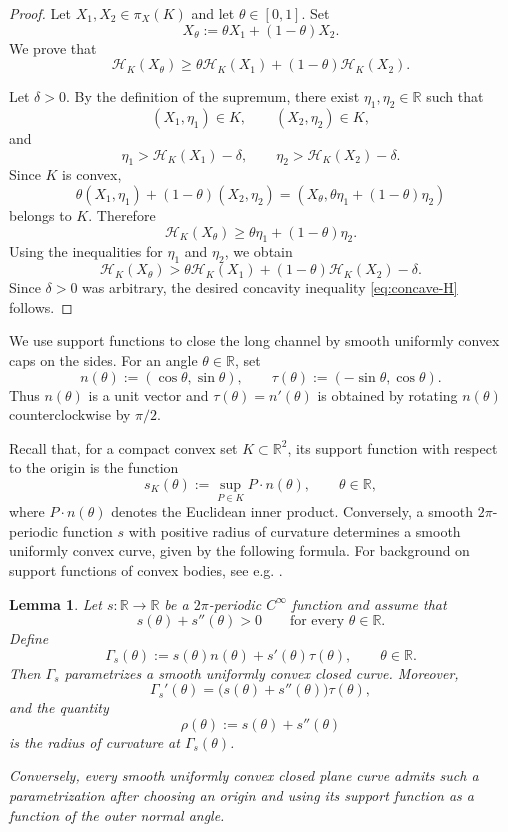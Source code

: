 \documentclass[reqno,12pt]{amsart}
\numberwithin{equation}{section}
\newtheorem{lemma}[theorem]{Lemma}
\theoremstyle{remark}
\begin{document}
\begin{proof}
Let $X_1,X_2\in\pi_X(K)$ and let $\theta\in[0,1]$.  Set
$$
X_\theta:=\theta X_1+(1-\theta)X_2.
$$
We prove that
\begin{equation}\label{eq:concave-H}
    \mathcal H_K(X_\theta)\ge \theta \mathcal H_K(X_1)+(1-\theta)\mathcal H_K(X_2).
\end{equation}

Let $\delta>0$.  By the definition of the supremum, there exist
$\eta_1,\eta_2\in\mathbb R$ such that
$$
(X_1,\eta_1)\in K,\qquad (X_2,\eta_2)\in K,
$$
and
$$
\eta_1>\mathcal H_K(X_1)-\delta,\qquad \eta_2>\mathcal H_K(X_2)-\delta.
$$
Since $K$ is convex,
$$
\theta(X_1,\eta_1)+(1-\theta)(X_2,\eta_2) = (X_\theta,\theta\eta_1+(1-\theta)\eta_2)
$$
belongs to $K$.  Therefore
$$
\mathcal H_K(X_\theta)\ge \theta\eta_1+(1-\theta)\eta_2.
$$
Using the inequalities for $\eta_1$ and $\eta_2$, we obtain
$$
\mathcal H_K(X_\theta)
> \theta \mathcal H_K(X_1)+(1-\theta)\mathcal H_K(X_2)-\delta.
$$
Since $\delta>0$ was arbitrary, the desired concavity inequality \eqref{eq:concave-H} follows.
\end{proof}
 
 



We  use support functions  to close the long channel by smooth uniformly convex caps on the sides.   For an angle $\theta\in\mathbb R$, set
$$
 n(\theta):=(\cos\theta,\sin\theta),
 \qquad
 \tau(\theta):=(-\sin\theta,\cos\theta).
$$
Thus $n(\theta)$ is a unit vector and $\tau(\theta)=n'(\theta)$ is obtained by
rotating $n(\theta)$ counterclockwise by $\pi/2$.

Recall that, for a  compact convex set $K\subset\mathbb R^2$, its support function with respect to the origin is the function
$$
 s_K(\theta):=\sup_{P\in K} P\cdot n(\theta),
 \qquad \theta\in\mathbb R,
$$
where $P\cdot n(\theta)$ denotes the Euclidean inner product.  Conversely, a smooth $2\pi$-periodic function $s$ with positive radius of curvature determines a smooth uniformly convex curve, given by the following formula. For  background on support functions of convex bodies, see e.g. \cite[Section 2.5]{Schneider2013}.

\begin{lemma}\label{lem:support-function}
Let $s:\mathbb R\to\mathbb R$ be a $2\pi$-periodic $C^\infty$ function and assume
that
$$
 s(\theta)+s''(\theta)>0 \qquad\text{for every }\theta\in\mathbb R.
$$
Define
$$ \Gamma_s(\theta):=s(\theta)n(\theta)+s'(\theta)\tau(\theta),
 \qquad \theta\in\mathbb R.
$$
Then $\Gamma_s$ parametrizes a smooth uniformly convex closed curve.  Moreover,
$$
\Gamma_s'(\theta)=\bigl(s(\theta)+s''(\theta)\bigr)\tau(\theta),
$$
and the quantity
$$
 \rho(\theta):=s(\theta)+s''(\theta)
$$
is the radius of curvature at $\Gamma_s(\theta)$.  

Conversely, every smooth uniformly convex closed plane curve admits such a parametrization after choosing an origin and using its support function as a function of the outer normal angle.
\end{lemma}
\end{document}
